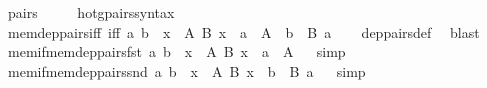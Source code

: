 \begin{isabellebody}
\ pairs\ {\isacharparenleft}{\kern0pt}\ {\isachardoublequoteopen}{\isasymtimes}{\isachardoublequoteclose}\ {}{}{\isacharparenright}{\kern0pt}\ \isamarkupfalse%
\isanewline
\isanewline
{}\isamarkupfalse%
\ hotg{\isacharunderscore}{\kern0pt}pairs{\isacharunderscore}{\kern0pt}syntax\isanewline
\isanewline
{}\isamarkupfalse%
\ mem{\isacharunderscore}{\kern0pt}dep{\isacharunderscore}{\kern0pt}pairs{\isacharunderscore}{\kern0pt}iff\ {\isacharbrackleft}{\kern0pt}iff{\isacharbrackright}{\kern0pt}{\isacharcolon}{\kern0pt}\ {\isachardoublequoteopen}{\isasymlangle}a{\isacharcomma}{\kern0pt}\ b{\isasymrangle}\ {\isasymin}\ {\isacharparenleft}{\kern0pt}{\isasymSum}x\ {\isasymin}\ A{\isachardot}{\kern0pt}\ B\ x{\isacharparenright}{\kern0pt}\ {\isasymlongleftrightarrow}\ a\ {\isasymin}\ A\ {\isasymand}\ b\ {\isasymin}\ B\ a{\isachardoublequoteclose}\isanewline
%
\isadelimproof
\ \ %
\endisadelimproof
%
\isatagproof
{}\isamarkupfalse%
\ dep{\isacharunderscore}{\kern0pt}pairs{\isacharunderscore}{\kern0pt}def\ \isamarkupfalse%
\ blast%
\endisatagproof
{\isafoldproof}%
%
\isadelimproof
\isanewline
%
\endisadelimproof
\isanewline
{}\isamarkupfalse%
\ mem{\isacharunderscore}{\kern0pt}if{\isacharunderscore}{\kern0pt}mem{\isacharunderscore}{\kern0pt}dep{\isacharunderscore}{\kern0pt}pairs{\isacharunderscore}{\kern0pt}fst{\isacharcolon}{\kern0pt}\ {\isachardoublequoteopen}{\isasymlangle}a{\isacharcomma}{\kern0pt}\ b{\isasymrangle}\ {\isasymin}\ {\isacharparenleft}{\kern0pt}{\isasymSum}x\ {\isasymin}\ A{\isachardot}{\kern0pt}\ B\ x{\isacharparenright}{\kern0pt}\ {\isasymLongrightarrow}\ a\ {\isasymin}\ A{\isachardoublequoteclose}%
\isadelimproof
\ %
\endisadelimproof
%
\isatagproof
{}\isamarkupfalse%
\ simp%
\endisatagproof
{\isafoldproof}%
%
\isadelimproof
%
\endisadelimproof
\isanewline
{}\isamarkupfalse%
\ mem{\isacharunderscore}{\kern0pt}if{\isacharunderscore}{\kern0pt}mem{\isacharunderscore}{\kern0pt}dep{\isacharunderscore}{\kern0pt}pairs{\isacharunderscore}{\kern0pt}snd{\isacharcolon}{\kern0pt}\ {\isachardoublequoteopen}{\isasymlangle}a{\isacharcomma}{\kern0pt}\ b{\isasymrangle}\ {\isasymin}\ {\isacharparenleft}{\kern0pt}{\isasymSum}x\ {\isasymin}\ A{\isachardot}{\kern0pt}\ B\ x{\isacharparenright}{\kern0pt}\ {\isasymLongrightarrow}\ b\ {\isasymin}\ B\ a{\isachardoublequoteclose}%
\isadelimproof
\ %
\endisadelimproof
%
\isatagproof
{}\isamarkupfalse%
\ simp%
\endisatagproof
{\isafoldproof}%

\end{isabellebody}
